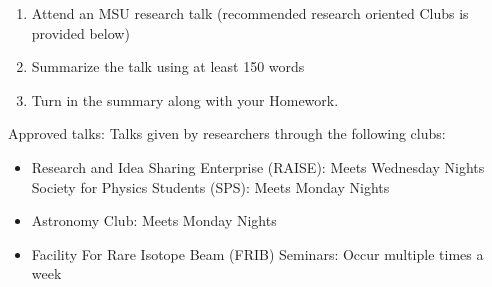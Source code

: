 \documentclass[%
oneside,                 %
final,                   %
10pt]{article}
\begin{document}
\begin{enumerate}
\item Attend an MSU research talk (recommended research oriented Clubs is  provided below)

\item Summarize the talk using at least 150 words

\item Turn in the summary along with your Homework.
\end{enumerate}

\noindent
Approved talks:
Talks given by researchers through the following clubs:
\begin{itemize}
\item Research and Idea Sharing Enterprise (RAISE)​: Meets Wednesday Nights Society for Physics Students (SPS)​: Meets Monday Nights

\item Astronomy Club​: Meets Monday Nights

\item Facility For Rare Isotope Beam (FRIB) Seminars: ​Occur multiple times a week
\end{itemize}

\noindent


\end{document}
